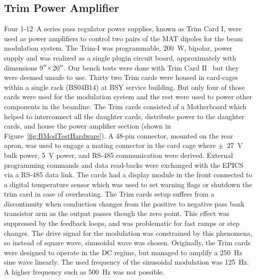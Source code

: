 \subsection{Trim Power Amplifier}
\label{Trim Power Amplifier}
Four 1-12~A series pass regulator power supplies, known as Trim Card I, were used as power amplifiers to control two pairs of the MAT dipoles for the beam modulation system. The Trim-I was programmable, 200~W, bipolar, power supply and was realized as a single plugin circuit board, approximately with dimensions 9$^{\prime\prime}\times$20$^{\prime\prime}$. Our bench tests were done with Trim Card II~\cite{1591576} but they were deemed unsafe to use. Thirty two Trim cards were housed in card-cages within a single rack (BS04B14) at BSY service building. But only four of those cards were used for the modulation system and the rest were used to power other components in the beamline. The Trim cards consisted of a Motherboard which helped to interconnect all the daughter cards, distribute power to the daughter cards, and house the power amplifier section (shown in Figure~\ref{fig:BModTestHardware}). A 48-pin connector, mounted on the rear apron, was used to engage a mating connector in the card cage where $\pm$~27~V bulk power, 5~V power, and RS-485 communication were derived. External programming commands and data read-backs were exchanged with the EPICS via a RS-485 data link. The cards had a display module in the front connected to a digital temperature sensor which was used to set warning flags or shutdown the trim card in case of overheating. The Trim cards setup suffers from a discontinuity when conduction changes from the positive to negative pass bank transistor arm as the output passes though the zero point. This effect was suppressed by the feedback loops, and was problematic for fast ramps or step changes. The drive signal for the modulation was constrained by this phenomena, so instead of square wave, sinusoidal wave was chosen. Originally, the Trim cards were designed to operate in the DC regime, but managed to amplify a 250~Hz sine wave linearly. The used frequency of the sinusoidal modulation was 125~Hz. %
A higher frequency such as 500~Hz was not possible. 

